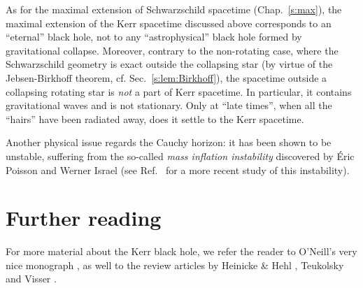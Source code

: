 As for the maximal extension of Schwarzschild spacetime (Chap.~\ref{s:max}), the
maximal extension of the Kerr spacetime discussed above
corresponds to an ``eternal'' black hole, not to any ``astrophysical'' black hole
formed by gravitational
collapse. Moreover, contrary to the non-rotating case, where the Schwarzschild geometry
is exact outside the collapsing star (by virtue of the
Jebsen-Birkhoff theorem, cf. Sec.~\ref{s:lem:Birkhoff}), the spacetime outside
a collapsing rotating star is \emph{not} a part of Kerr spacetime. In particular, it contains gravitational waves and is not stationary. Only at ``late times'', when all the ``hairs'' have
been radiated away, does it settle to the Kerr spacetime.

Another physical issue regards the Cauchy horizon: it has been shown
to be unstable, suffering from the so-called
\emph{mass inflation instability}
discovered by Éric Poisson
and Werner Israel \cite{PoissI90}
(see Ref.~\cite{BurkoKZ16} for a more recent study of this instability).

\section{Further reading}

For more material about the Kerr black hole, we refer
the reader to O'Neill's very nice monograph \cite{ONeil95},
as well to the review articles by
Heinicke \& Hehl \cite{HeiniH15}, Teukolsky \cite{Teuko15} and
Visser \cite{Visse09}.
